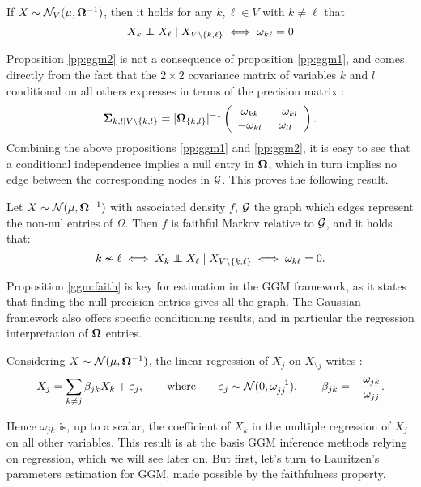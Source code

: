  \begin{prop}\label{pp:ggm2}If  $X\sim \mathcal{N}_V(\mu, {\boldsymbol{\Omega}}^{-1})$, then it holds for any $k,\ell\in V$ with $k\neq \ell$ that
$$X_k \independent X_\ell \mid X_{V\setminus\{k,\ell\}} \iff \omega_{k\ell}=0 $$
 \end{prop}
  Proposition \ref{pp:ggm2} is not a consequence of proposition \ref{pp:ggm1}, and comes directly from the fact that the $2\times 2$  covariance matrix of variables $k$ and $l$ conditional on all others expresses in terms of the precision matrix : $${\boldsymbol{\Sigma}}_{k,l\mid V\setminus\{k,l\}} = |{\boldsymbol{\Omega}}_{\{k,l\}}|^{-1} \left(\begin{array}{cc}
\omega_{kk} & -\omega_{kl}\\
-\omega_{kl} & \omega_{ll}  
  \end{array}\right).$$
Combining the above propositions \ref{pp:ggm1} and \ref{pp:ggm2}, it is easy to see that a conditional independence implies a null entry in ${\boldsymbol{\Omega}}$, which in turn implies no edge between the corresponding nodes in $\mathcal{G}$. This proves the following result.

\begin{prop}\label{ggm:faith}
 Let $X\sim \mathcal{N}(\mu, {\boldsymbol{\Omega}}^{-1})$ with associated density $f$, $\mathcal{G}$ the graph which edges represent the non-nul entries of $\Omega$. Then $f$ is faithful Markov relative to $\mathcal{G}$,  and it holds that:
 $$k\nsim \ell \iff  X_k \independent X_\ell \mid X_{V\setminus\{k,\ell\}} \iff \omega_{k\ell}=0.$$
\end{prop} 

Proposition \ref{ggm:faith} is key for estimation in the GGM framework, as it states that finding the null precision entries gives all the graph. The Gaussian framework also offers specific conditioning results, and in particular the regression interpretation of ${\boldsymbol{\Omega}}$ entries.

\begin{prop}\label{ggm:reg}
 Considering $X\sim \mathcal{N}(\mu, {\boldsymbol{\Omega}}^{-1})$, the linear regression of  $X_j$ on $X_{\setminus j}$ writes :
$$X_j = \sum_{k\neq j} \beta_{jk} X_k + \varepsilon_j,\qquad \text{where}\qquad\varepsilon_j \sim \mathcal{N} (0, \omega_{jj}^{-1}), \qquad \beta_{jk} = -\frac{\omega_{jk}}{\omega_{jj}}.$$

\end{prop}
Hence $\omega_{jk}$ is, up to a scalar, the coefficient of $X_k$ in the multiple regression of $X_j$ on all other variables. This result is at the basis GGM inference methods relying on regression, which we will see later on. But first, let's turn to Lauritzen's  parameters estimation for GGM, made possible by the faithfulness property.

